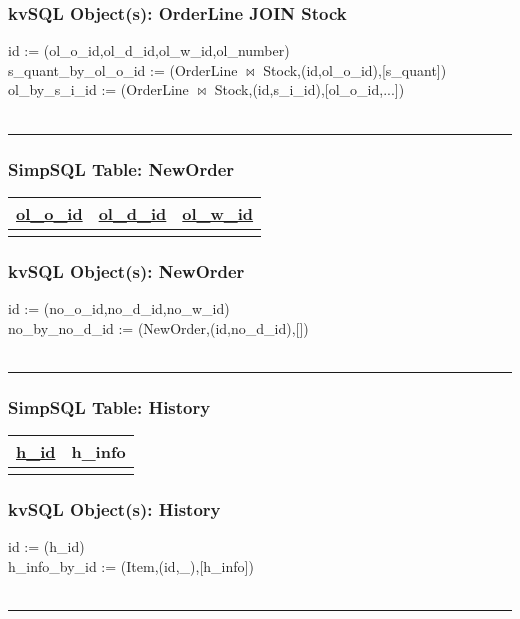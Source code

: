 \subsubsection*{kvSQL Object(s): OrderLine JOIN Stock}  
id := (ol\_o\_id,ol\_d\_id,ol\_w\_id,ol\_number) \\
s\_quant\_by\_ol\_o\_id :=
(OrderLine $\bowtie$ Stock,(id,ol\_o\_id),[s\_quant]) \\
ol\_by\_s\_i\_id :=
(OrderLine $\bowtie$ Stock,(id,s\_i\_id),[ol\_o\_id,...]) \\
\\ 
\hrule


\subsubsection*{SimpSQL Table: NewOrder}
\begin{tabular}{ |c|c|c| }
 \hline
 \underline{ol\_o\_id} & \underline{ol\_d\_id} & \underline{ol\_w\_id}\\
 \hline
 &   &  \\
 \hline
\end{tabular}

\subsubsection*{kvSQL Object(s): NewOrder}  
id := (no\_o\_id,no\_d\_id,no\_w\_id) \\
no\_by\_no\_d\_id :=
(NewOrder,(id,no\_d\_id),[]) \\
\\ 
\hrule

\subsubsection*{SimpSQL Table: History}  
\begin{tabular}{ |c|c| }
 \hline
 \underline{h\_id} & h\_info\\
 \hline
 &   \\
 \hline
\end{tabular}

\subsubsection*{kvSQL Object(s): History}  
id := (h\_id)\\
 h\_info\_by\_id := 
(Item,(id,\_),[h\_info]) \\
\\
\hrule


